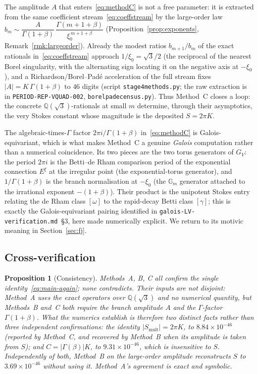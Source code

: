 \documentclass[11pt,reqno]{amsart}
\renewcommand{\_}{\vquadorigunderscore\allowbreak}
\theoremstyle{plain}
\newtheorem{proposition}[theorem]{Proposition}
\theoremstyle{definition}
\newcommand{\Qsqrt}{\mathbb{Q}(\sqrt3)}
\newcommand{\xizero}{\xi_0}
\newcommand{\Gm}{\mathbb{G}_m}
\providecommand{\C}{}\renewcommand{\C}{C}
\begin{document}
The amplitude $A$ that enters~\eqref{eq:methodC} is not a free parameter: it is extracted from the
same coefficient stream~\eqref{eq:coeffstream} by the large-order law
$b_m\sim \dfrac{A}{\Gamma(1+\beta)}\,\dfrac{\Gamma(m+1+\beta)}{\xizero^{\,m+1+\beta}}$
(Proposition~\ref{prop:exponents}, Remark~\ref{rmk:largeorder}). Already the modest ratios
$b_{m+1}/b_m$ of the exact rationals in~\eqref{eq:coeffstream} approach $1/\xizero=\sqrt3/2$ (the
reciprocal of the nearest Borel singularity, with the alternating sign locating it on the negative
axis at $-\xizero$), and a Richardson/Borel--Pad\'e acceleration of the full stream fixes
$\lvert A\rvert=K\,\Gamma(1+\beta)$ to $46$ digits (script \texttt{stage4\_methods.py}; the raw
extraction is in \texttt{PERIOD-REP-VQUAD-002}, \texttt{borel\_pade\_census.py}). Thus Method~C
closes a loop: the concrete $\Qsqrt$-rationals at small $m$ determine, through their asymptotics,
the very Stokes constant whose magnitude is the deposited $S=2\pi K$.

The algebraic-times-$\Gamma$ factor $2\pi i/\Gamma(1+\beta)$ in~\eqref{eq:methodC} is
Galois-equivariant, which is what makes Method~C a genuine \emph{Galois} computation rather than a
numerical coincidence. Its two pieces are the two torus generators of $G_V$: the period $2\pi i$ is
the Betti--de Rham comparison period of the exponential connection $E^{\xi}$ at the irregular point
(the exponential-torus generator), and $1/\Gamma(1+\beta)$ is the branch normalisation at
$-\xizero$ (the $\Gm$ generator attached to the irrational exponent $-(1+\beta)$). Their product is
the unipotent Stokes entry relating the de Rham class $[\omega]$ to the rapid-decay Betti class
$[\gamma]$; this is exactly the Galois-equivariant pairing identified in
\texttt{galois-LV-verification.md}~\S3, here made numerically explicit. We return to its motivic
meaning in Section~\ref{sec:fj}.

\subsection{Cross-verification}\label{sub:cross}
\begin{proposition}[Consistency]\label{prop:cross}
Methods~A, B, C all confirm the single identity~\eqref{eq:main-again}; none contradicts. Their
inputs are not disjoint: Method~A uses the exact operators over $\Qsqrt$ and no numerical
quantity, but Methods~B and~C both require the branch amplitude $A$ and the $\Gamma$-factor
$\Gamma(1+\beta)$. What the numerics establish is therefore two distinct facts rather than three
independent confirmations: the identity $\lvert S_{\mathrm{mult}}\rvert=2\pi K$, to
$8.84\times10^{-46}$ (reported by Method~C, and recovered by Method~B when its amplitude is taken
from $S$); and $\C=\lvert\Gamma(\beta)\rvert K$, to $9.31\times10^{-46}$, which is insensitive to
$S$. Independently of both, Method~B on the large-order amplitude reconstructs $S$ to
$3.69\times10^{-46}$ without using it. Method~A's agreement is exact and symbolic.
\end{proposition}
\end{document}
